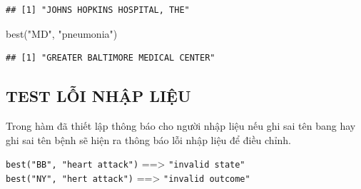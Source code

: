 \documentclass[
]{book}
\newenvironment{Shaded}{\begin{snugshade}}{\end{snugshade}}
\newcommand{\FunctionTok}[1]{\textcolor[rgb]{0.00,0.00,0.00}{#1}}
\newcommand{\NormalTok}[1]{#1}
\newcommand{\StringTok}[1]{\textcolor[rgb]{0.31,0.60,0.02}{#1}}
\theoremstyle{definition}
\theoremstyle{definition}
\theoremstyle{definition}
\theoremstyle{definition}
\theoremstyle{remark}
\begin{document}
\begin{verbatim}
## [1] "JOHNS HOPKINS HOSPITAL, THE"
\end{verbatim}

\begin{Shaded}
\begin{Highlighting}[]
\FunctionTok{best}\NormalTok{(}\StringTok{"MD"}\NormalTok{, }\StringTok{"pneumonia"}\NormalTok{)}
\end{Highlighting}
\end{Shaded}

\begin{verbatim}
## [1] "GREATER BALTIMORE MEDICAL CENTER"
\end{verbatim}

\hypertarget{test-lux1ed7i-nhux1eadp-liux1ec7u}{%
\subsection{TEST LỖI NHẬP LIỆU}\label{test-lux1ed7i-nhux1eadp-liux1ec7u}}

Trong hàm đã thiết lập thông báo cho người nhập liệu nếu ghi sai tên bang hay ghi sai tên bệnh sẽ hiện ra thông báo lỗi nhập liệu để điều chỉnh.

\texttt{best("BB",\ "heart\ attack")} ==\textgreater{} \texttt{"invalid\ state"}
\texttt{best("NY",\ "hert\ attack")} ==\textgreater{} \texttt{"invalid\ outcome"}

  
\end{document}
